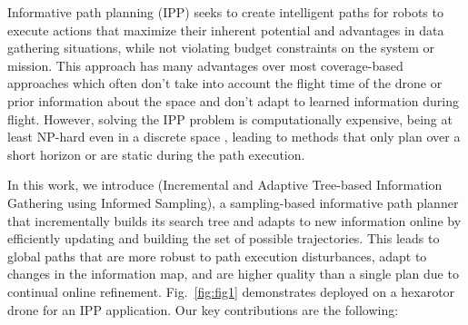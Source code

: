 Informative path planning (IPP) seeks to create intelligent paths for robots to execute actions that maximize their inherent potential and advantages in data gathering situations, while not violating budget constraints on the system or mission. This approach has many advantages over most coverage-based approaches which often don't take into account the flight time of the drone or prior information about the space and don't adapt to learned information during flight. However, solving the IPP problem is computationally expensive, being at least NP-hard even in a discrete space \cite{singh2009}, leading to methods that only plan over a short horizon or are static during the path execution.


In this work, we introduce \PlannerNameSpaced (Incremental and Adaptive Tree-based Information Gathering using Informed Sampling), a sampling-based informative path planner that incrementally builds its search tree and adapts to new information online by efficiently updating and building the set of possible trajectories. This leads to global paths that are more robust to path execution disturbances, adapt to changes in the information map, and are higher quality than a single plan due to continual online refinement. Fig.~\ref{fig:fig1} demonstrates \PlannerNameSpaced deployed on a hexarotor drone for an IPP application. Our key contributions are the following:




